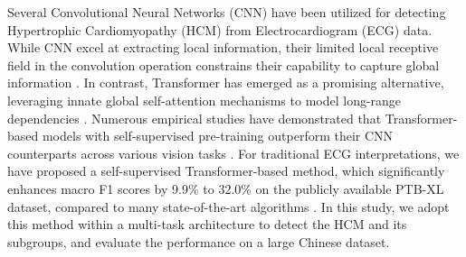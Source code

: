 \documentclass[11pt]{article}
\theoremstyle{definition}
\begin{document}
Several Convolutional Neural Networks (CNN) have been utilized for detecting Hypertrophic Cardiomyopathy (HCM) from Electrocardiogram (ECG) data. While CNN excel at extracting local information, their limited local receptive field in the convolution operation constrains their capability to capture global information \citep{song2022ctmfnet, yang2021transformer}. In contrast, Transformer has emerged as a promising alternative, leveraging innate global self-attention mechanisms to model long-range dependencies \citep{vaswani2017attention, dosovitskiy2020image}. Numerous empirical studies have demonstrated that Transformer-based models with self-supervised pre-training outperform their CNN counterparts across various vision tasks \citep{matsoukas2021time}. For traditional ECG interpretations, we have proposed a self-supervised Transformer-based method, which significantly enhances macro F1 scores by 9.9\% to 32.0\% on the publicly available PTB-XL dataset, compared to many state-of-the-art algorithms \citep{wagner2020ptb, zhou2023masked}. 
In this study, we adopt this method within a multi-task architecture to detect the HCM and its subgroups, and evaluate the performance on a large Chinese dataset. 




%
\end{document}

